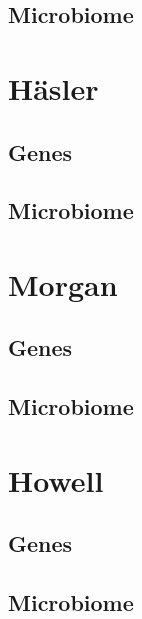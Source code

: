 \documentclass[
  12pt,
  a4paper,
  twoside,
  openright]{book}
\begin{document}
\hypertarget{microbiome-2}{%
\subsection{Microbiome}\label{microbiome-2}}

\hypertarget{huxe4sler}{%
\section{Häsler}\label{huxe4sler}}

\hypertarget{genes-1}{%
\subsection{Genes}\label{genes-1}}

\hypertarget{microbiome-3}{%
\subsection{Microbiome}\label{microbiome-3}}

\hypertarget{morgan}{%
\section{Morgan}\label{morgan}}

\hypertarget{genes-2}{%
\subsection{Genes}\label{genes-2}}

\hypertarget{microbiome-4}{%
\subsection{Microbiome}\label{microbiome-4}}

\hypertarget{howell}{%
\section{Howell}\label{howell}}

\hypertarget{genes-3}{%
\subsection{Genes}\label{genes-3}}

\hypertarget{microbiome-5}{%
\subsection{Microbiome}\label{microbiome-5}}
\end{document}
